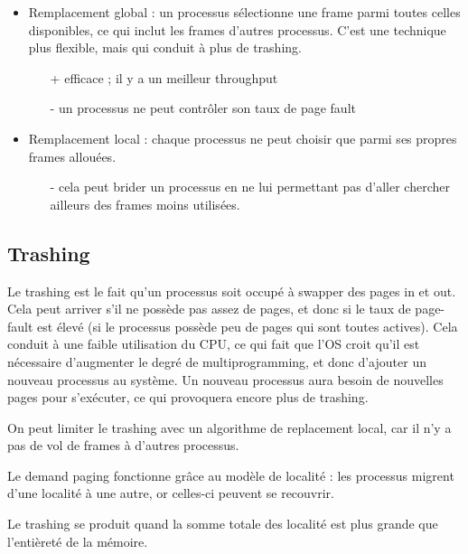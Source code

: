 	\begin{itemize}
		\item Remplacement global : un processus sélectionne une frame parmi toutes celles disponibles, ce qui inclut les frames d'autres processus. C'est une technique plus flexible, mais qui conduit à plus de trashing.
		
		\begin{itemize}
			\item[+] efficace ; il y a un meilleur throughput
			\item[-] un processus ne peut contrôler son taux de page fault
		\end{itemize}
		
		\item Remplacement local : chaque processus ne peut choisir que parmi ses propres frames allouées.
		
		
		\begin{itemize}
			\item[-] cela peut brider un processus en ne lui permettant pas d'aller chercher ailleurs des frames moins utilisées.
		\end{itemize}
	\end{itemize}
	
	
	\subsection{Trashing}
	
	Le trashing est le fait qu'un processus soit occupé à swapper des pages in et out. Cela peut arriver s'il ne possède pas assez de pages, et donc si le taux de page-fault est élevé (si le processus possède peu de pages qui sont toutes actives). Cela conduit à une faible utilisation du CPU, ce qui fait que l'OS croit qu'il est nécessaire d'augmenter le degré de multiprogramming, et donc d'ajouter un nouveau processus au système. Un nouveau processus aura besoin de nouvelles pages pour s'exécuter, ce qui provoquera encore plus de trashing.
	
	
	On peut limiter le trashing avec un algorithme de replacement local, car il n'y a pas de vol de frames à d'autres processus.
	
	Le demand paging fonctionne grâce au modèle de localité : les processus migrent d'une localité à une autre, or celles-ci peuvent se recouvrir.
	
	Le trashing se produit quand la somme totale des localité est plus grande que l'entièreté de la mémoire.
	
